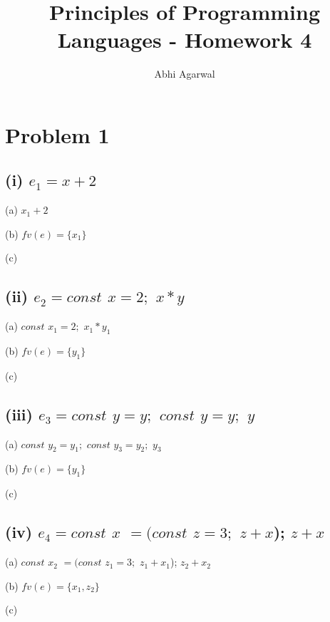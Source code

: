 \documentclass[11pt, oneside]{article}
\title{Principles of Programming Languages - Homework 4}
\author{Abhi Agarwal}
\date{}
\newcommand{\forceindent}{\leavevmode{\parindent=1.5em\indent}}
\begin{document}
\maketitle
\section{Problem 1}
\subsection*{(i) $e_1 = x + 2$}
\forceindent \par (a) $x_1 + 2$
\par (b) $fv (e) = \{x_1\}$
\par (c)

\subsection*{(ii) $e_2 = const$ $x = 2;$ $ x * y$}
\forceindent \par (a) $const$ $x_1 = 2;$ $ x_1 * y_1$
\par (b) $fv (e) = \{y_1\}$
\par (c)

\subsection*{(iii) $e_3 = const$ $y = y;$ $const$ $y = y;$ $y$}
\forceindent \par (a) $const$ $y_2 = y_1;$ $const$ $y_3 = y_2;$ $y_3$
\par (b) $fv (e) = \{y_1\}$
\par (c)

\subsection*{(iv) $e_4 = const$ $x$ $= (const$ $z= 3;$ $z + x$); $z + x$}
\forceindent \par (a) $const$ $x_2$ $= (const$ $z_1 = 3;$ $z_1 + x_1$); $z_2 + x_2$
\par (b) $fv (e) = \{x_1, z_2\}$
\par (c)
\end{document}
